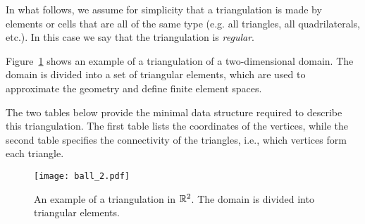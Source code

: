 In what follows, we assume for simplicity that a triangulation is made by
elements or cells that are all of the same type (e.g. all triangles, all
quadrilaterals, etc.). In this case we say that the triangulation is
\emph{regular}.

Figure~\ref{fig:triangulation} shows an example of a triangulation of a two-dimensional domain. The domain is divided into a set of triangular elements, which are used to approximate the geometry and define finite element spaces.

The two tables below provide the minimal data structure required to describe this triangulation. The first table lists the coordinates of the vertices, while the second table specifies the connectivity of the triangles, i.e., which vertices form each triangle.

\begin{figure}[!htb]
\centering
\texttt{[image: ball\_2.pdf]}
\caption{An example of a triangulation in $\mathbb{R}^2$. The domain is divided into triangular elements.}
\label{fig:triangulation}
\end{figure}

